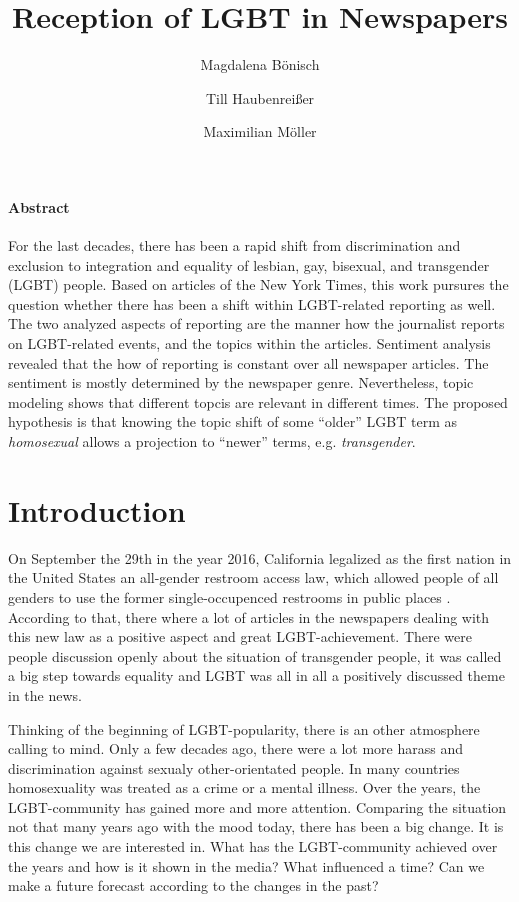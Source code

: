 \documentclass[10pt,a4paper,twocolumn]{scrartcl}
\title{Reception of LGBT in Newspapers}
\author{Magdalena Bönisch \and Till Haubenreißer \and Maximilian Möller}
\begin{document}
\onehalfspacing

\maketitle

{\small
\paragraph*{Abstract} For the last decades, there has been a rapid shift from discrimination and exclusion to integration and equality of lesbian, gay, bisexual, and transgender (LGBT) people. Based on articles of the New York Times, this work pursures the question whether there has been a shift within LGBT-related reporting as well. The two analyzed aspects of reporting are the manner how the journalist reports on LGBT-related events, and the topics within the articles. Sentiment analysis revealed that the how of reporting is constant over all newspaper articles. The sentiment is mostly determined by the newspaper genre. Nevertheless, topic modeling shows that different topcis are relevant in different times. The proposed hypothesis is that knowing the topic shift of some ``older'' LGBT term as \textit{homosexual} allows a projection to ``newer'' terms, e.g. \textit{transgender}.
}


\section{Introduction}
On September the 29th in the year 2016, California legalized as the first nation in the United States an all-gender restroom access law, which allowed people of all genders to use the former single-occupenced restrooms in public places \citep{Ring:2016}. According to that, there where a lot of articles in the newspapers dealing with this new law as a positive aspect and great LGBT-achievement. There were people discussion openly about the situation of transgender people, it was called a big step towards equality and LGBT was all in all a positively discussed theme in the news.

Thinking of the beginning of LGBT-popularity, there is an other atmosphere calling to mind. Only a few decades ago, there were a lot more harass and discrimination against sexualy other-orientated people. In many countries homosexuality was treated as a crime or a mental illness. Over the years, the LGBT-community has gained more and more attention. Comparing the situation not that many years ago with the mood today, there has been a big change. It is this change we are interested in. What has the LGBT-community achieved over the years and how is it shown in the media? What influenced a time? Can we make a future forecast according to the changes in the past?
\end{document}
